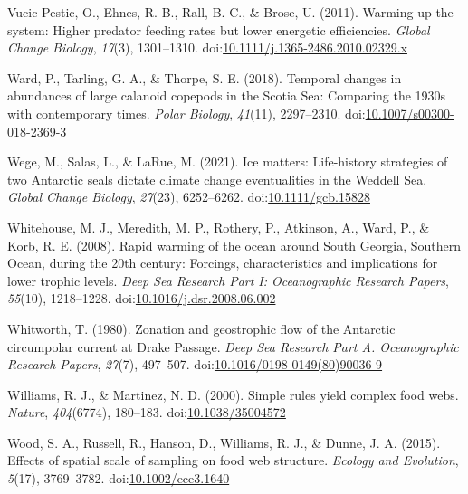 \documentclass[
]{article}
\newlength{\cslhangindent}
\newlength{\cslentryspacingunit} %
\newenvironment{CSLReferences}[2] %
 {%
  \setlength{\parindent}{0pt}
  \ifodd #1
  \let\oldpar\par
  \def\par{\hangindent=\cslhangindent\oldpar}
  \fi
  \setlength{\parskip}{#2\cslentryspacingunit}
 }%
 {}
\begin{document}
\begin{CSLReferences}{1}{0}
\leavevmode{}%
Vucic-Pestic, O., Ehnes, R. B., Rall, B. C., \& Brose, U. (2011).
Warming up the system: Higher predator feeding rates but lower energetic
efficiencies. \emph{Global Change Biology}, \emph{17}(3), 1301--1310.
doi:\href{https://doi.org/10.1111/j.1365-2486.2010.02329.x}{10.1111/j.1365-2486.2010.02329.x}

\leavevmode{}%
Ward, P., Tarling, G. A., \& Thorpe, S. E. (2018). Temporal changes in
abundances of large calanoid copepods in the {Scotia Sea}: Comparing the
1930s with contemporary times. \emph{Polar Biology}, \emph{41}(11),
2297--2310.
doi:\href{https://doi.org/10.1007/s00300-018-2369-3}{10.1007/s00300-018-2369-3}

\leavevmode{}%
Wege, M., Salas, L., \& LaRue, M. (2021). Ice matters: {Life-history}
strategies of two {Antarctic} seals dictate climate change eventualities
in the {Weddell Sea}. \emph{Global Change Biology}, \emph{27}(23),
6252--6262.
doi:\href{https://doi.org/10.1111/gcb.15828}{10.1111/gcb.15828}

\leavevmode{}%
Whitehouse, M. J., Meredith, M. P., Rothery, P., Atkinson, A., Ward, P.,
\& Korb, R. E. (2008). Rapid warming of the ocean around {South
Georgia}, {Southern Ocean}, during the 20th century: {Forcings},
characteristics and implications for lower trophic levels. \emph{Deep
Sea Research Part I: Oceanographic Research Papers}, \emph{55}(10),
1218--1228.
doi:\href{https://doi.org/10.1016/j.dsr.2008.06.002}{10.1016/j.dsr.2008.06.002}

\leavevmode{}%
Whitworth, T. (1980). Zonation and geostrophic flow of the {Antarctic}
circumpolar current at {Drake Passage}. \emph{Deep Sea Research Part A.
Oceanographic Research Papers}, \emph{27}(7), 497--507.
doi:\href{https://doi.org/10.1016/0198-0149(80)90036-9}{10.1016/0198-0149(80)90036-9}

\leavevmode{}%
Williams, R. J., \& Martinez, N. D. (2000). Simple rules yield complex
food webs. \emph{Nature}, \emph{404}(6774), 180--183.
doi:\href{https://doi.org/10.1038/35004572}{10.1038/35004572}

\leavevmode{}%
Wood, S. A., Russell, R., Hanson, D., Williams, R. J., \& Dunne, J. A.
(2015). Effects of spatial scale of sampling on food web structure.
\emph{Ecology and Evolution}, \emph{5}(17), 3769--3782.
doi:\href{https://doi.org/10.1002/ece3.1640}{10.1002/ece3.1640}


\end{CSLReferences}
\end{document}
